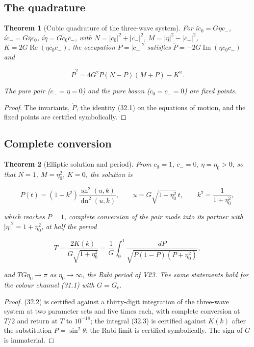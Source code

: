 \documentclass[11pt]{article}
\newtheorem{theorem}{Theorem}[section]
\theoremstyle{remark}
\begin{document}
\subsection{The quadrature}

\begin{theorem}[Cubic quadrature of the three-wave system]
\label{thm:v20v29-quadrature}
For \(i\dot c_0=G\eta c_-\), \(i\dot c_-=G\bar\eta c_0\),
\(i\dot\eta=Gc_0\bar c_-\), with \(N=|c_0|^2+|c_-|^2\),
\(M=|\eta|^2-|c_-|^2\), \(K=2G\operatorname{Re}(\eta\bar c_0c_-)\), the
occupation \(P=|c_-|^2\) satisfies \(\dot P=-2G\operatorname{Im}(\eta\bar c_0c_-)\)
and

\[
 \dot P^2=4G^2P(N-P)(M+P)-K^2.                                        \tag{32.1}
\]

The pure pair (\(c_-=\eta=0\)) and the pure boson (\(c_0=c_-=0\)) are
fixed points.
\end{theorem}

\begin{proof}
The invariants, \(\dot P\), the identity (32.1) on the equations of
motion, and the fixed points are certified symbolically.
\end{proof}

\subsection{Complete conversion}

\begin{theorem}[Elliptic solution and period]
\label{thm:v20v29-elliptic}
From \(c_0=1\), \(c_-=0\), \(\eta=\eta_0>0\), so that \(N=1\),
\(M=\eta_0^2\), \(K=0\), the solution is

\[
 P(t)=(1-k^2)\frac{\operatorname{sn}^2(u,k)}{\operatorname{dn}^2(u,k)},\qquad
 u=G\sqrt{1+\eta_0^2}\,t,\qquad k^2=\frac1{1+\eta_0^2},                \tag{32.2}
\]

which reaches \(P=1\), complete conversion of the pair mode into its
partner with \(|\eta|^2=1+\eta_0^2\), at half the period

\[
 T=\frac{2K(k)}{G\sqrt{1+\eta_0^2}}=\frac1G\int_0^1\frac{dP}{\sqrt{P(1-P)(P+\eta_0^2)}},
                                                                    \tag{32.3}
\]

and \(TG\eta_0\to\pi\) as \(\eta_0\to\infty\), the Rabi period of V23.
The same statements hold for the colour channel (31.1) with
\(G=G_c\).
\end{theorem}

\begin{proof}
(32.2) is certified against a thirty-digit integration of the
three-wave system at two parameter sets and five times each, with
complete conversion at \(T/2\) and return at \(T\) to \(10^{-18}\); the
integral (32.3) is certified against \(K(k)\) after the substitution
\(P=\sin^2\theta\); the Rabi limit is certified symbolically.  The sign
of \(G\) is immaterial.
\end{proof}
\end{document}
